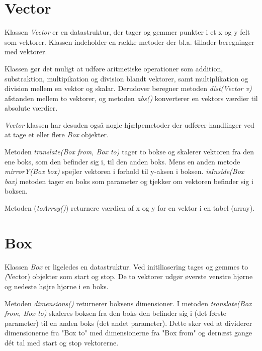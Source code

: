 \section{Vector}

Klassen \emph{Vector} er en datastruktur, der tager og gemmer punkter i et x og y felt som vektorer. Klassen indeholder en række metoder der bl.a. tillader beregninger med vektorer.

Klassen gør det muligt at udføre aritmetiske operationer som addition, substraktion, multipikation og division blandt vektorer, samt multiplikation og division mellem en vektor og skalar. Derudover beregner metoden \emph{dist(Vector v)} afstanden mellem to vektorer, og metoden \emph{abs()} konverterer en vektors værdier til absolute værdier.

\emph{Vector} klassen har desuden også nogle hjælpemetoder der udfører handlinger ved at tage et eller flere \emph{Box} objekter.

Metoden \emph{translate(Box from, Box to)} tager to bokse og skalerer vektoren fra den ene boks, som den befinder sig i, til den anden boks. Mens en anden metode \emph{mirrorY(Box box)} spejler vektoren i forhold til y-aksen i boksen. \emph{isInside(Box box)} metoden tager en boks som parameter og tjekker om vektoren befinder sig i boksen.

Metoden (\emph{toArray()}) returnere værdien af x og y for en vektor i en tabel (array).


\section{Box}

Klassen \emph{Box} er ligeledes en datastruktur. Ved initiliasering tages og gemmes to \emph(Vector) objekter som start og stop. De to vektorer udgør øverste venstre hjørne og nedeste højre hjørne i en boks.

Metoden \emph{dimensions()} returnerer boksens dimensioner. I metoden \emph{translate(Box from, Box to)} skaleres boksen fra den boks den befinder sig i (det første parameter) til en anden boks (det andet parameter). Dette sker ved at dividerer dimensionerne fra "Box to" med dimensionerne fra "Box from" og dernæst gange dét tal med start og stop vektorerne.

